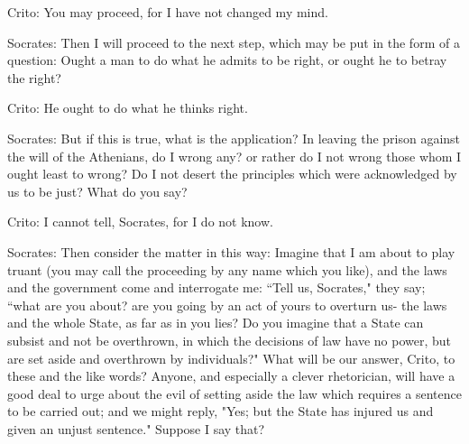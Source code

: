 Crito: You may proceed, for I have not changed my mind. 

Socrates: Then I will proceed to the next step, which may be put in the
form of a question: Ought a man to do what he admits to be right,
or ought he to betray the right? 

Crito: He ought to do what he thinks right. 

Socrates: But if this is true, what is the application? In leaving the
prison against the will of the Athenians, do I wrong any? or rather
do I not wrong those whom I ought least to wrong? Do I not desert
the principles which were acknowledged by us to be just? What do you
say? 

Crito: I cannot tell, Socrates, for I do not know. 

Socrates: Then consider the matter in this way: Imagine that I am about
to play truant (you may call the proceeding by any name which you
like), and the laws and the government come and interrogate me: ``Tell
us, Socrates," they say; ``what are you about? are you going by an
act of yours to overturn us- the laws and the whole State, as far
as in you lies? Do you imagine that a State can subsist and not be
overthrown, in which the decisions of law have no power, but are set
aside and overthrown by individuals?" What will be our answer, Crito,
to these and the like words? Anyone, and especially a clever rhetorician,
will have a good deal to urge about the evil of setting aside the
law which requires a sentence to be carried out; and we might reply,
"Yes; but the State has injured us and given an unjust sentence."
Suppose I say that? 

